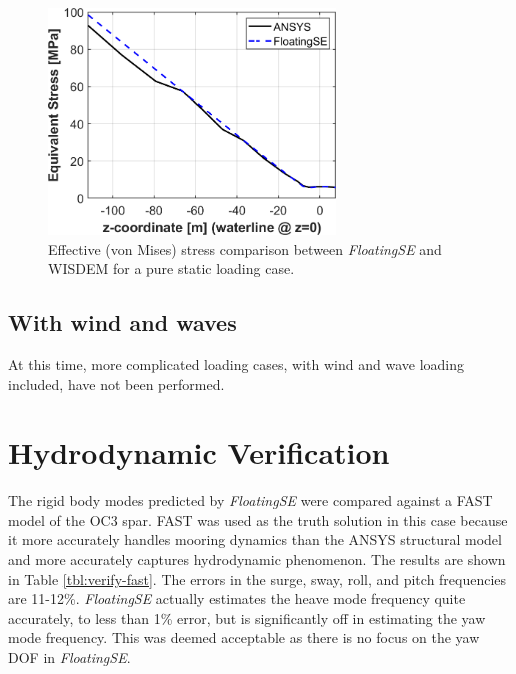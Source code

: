 \begin{figure}[htb]
  \begin{center}
    \includegraphics[width=3in]{figs/oc3-verification_equivalentstress.png}
    \caption{Effective (von Mises) stress comparison between
      \textit{FloatingSE} and WISDEM for a pure static loading case.}
    \label{fig:verify}
  \end{center}
\end{figure}

\subsection{With wind and waves}
At this time, more complicated loading cases, with wind and wave loading
included, have not been performed.

\section{Hydrodynamic Verification}
The rigid body modes predicted by \textit{FloatingSE} were compared
against a FAST model of the OC3 spar.  FAST was used as the truth
solution in this case because it more accurately handles mooring
dynamics than the ANSYS structural model and more accurately captures
hydrodynamic phenomenon.  The results are shown in Table
\ref{tbl:verify-fast}.  The errors in the surge, sway, roll, and pitch
frequencies are 11-12\%.  \textit{FloatingSE} actually estimates the
heave mode frequency quite accurately, to less than 1\% error, but is
significantly off in estimating the yaw mode frequency.  This was deemed
acceptable as there is no focus on the yaw DOF in \textit{FloatingSE}.

